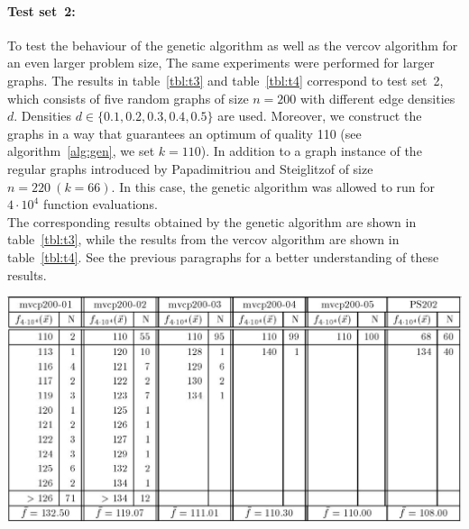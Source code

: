 \documentclass[12pt]{article}
\begin{document}
\paragraph{Test set~2:}
To test the behaviour of the genetic algorithm
as well as the vercov algorithm for an even
larger problem size, The same experiments
were performed for larger graphs.
The results in table~\ref{tbl:t3}
and table~\ref{tbl:t4} correspond to test set~2,
which consists of five random graphs of size
$n = 200$ with different edge densities $d$.
Densities $d \in \{0.1, 0.2, 0.3, 0.4, 0.5\}$ are used.
Moreover, we construct the graphs in a way that guarantees an optimum of quality 110
(see algorithm~\ref{alg:gen}, we set $k = 110$).
In addition to a graph instance of the regular graphs introduced by
Papadimitriou and Steiglitzof of size $n = 220 \ (k=66)$.
In this case, the genetic algorithm
was allowed to run for $4 \cdot 10^4$ function evaluations.\\
The corresponding results obtained by the
genetic algorithm are shown in table~\ref{tbl:t3}, while the results
from the vercov algorithm are shown in table~\ref{tbl:t4}.
See the previous paragraphs for a better understanding of these results.

\begin{table}[!htbp]
\centering
\includegraphics[width=1\textwidth]{t3}
\caption[Results obtained by GA for graphs in test set~2]{%
Experimental results obtained by the genetic algorithm for five random graphs of size $n = 200$ with edge density: $d = 0.1$ (``mvcp200-01''), $d = 0.2$ (``mvcp200-02''), $d = 0.3$ (``mvcp200-03''), $d = 0.5$ (``mvcp200-04''), $d = 0.5$ (``mvcp200-05'') and the regular graph of size $n = 202 \ (k=66)$ from Papadimitriou and Steiglitz (``PS202'').%
}
\label{tbl:t3}
\end{table}
\end{document}
